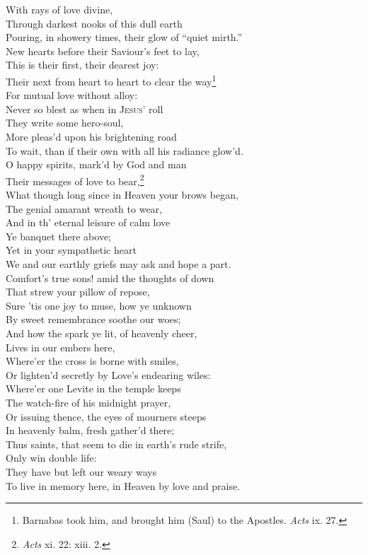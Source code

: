  With rays of love divine, \\
 Through darkest nooks of this dull earth \\
 Pouring, in showery times, their glow of “quiet mirth.” \\
  New hearts before their Saviour’s feet to lay, \\
 This is their first, their dearest joy: \\
 Their next from heart to heart to clear the way\footnote{Barnabas took him, and brought him (Saul) to the Apostles. \emph{Acts} ix. 27.} \\
 For mutual love without alloy: \\
 Never so blest as when in \textsc{Jesus}’ roll \\
 They write some hero-soul, \\
 More pleas’d upon his brightening road \\
 To wait, than if their own with all his radiance glow’d. \\
  O happy spirits, mark’d by God and man \\
 Their messages of love to bear,\footnote{\emph{Acts} xi. 22: xiii. 2.} \\
 What though long since in Heaven your brows began, \\
 The genial amarant wreath to wear, \\
 And in th’ eternal leisure of calm love \\
 Ye banquet there above; \\
 Yet in your sympathetic heart \\
 We and our earthly griefs may ask and hope a part. \\
  Comfort’s true sons! amid the thoughts of down \\
 That strew your pillow of repose, \\
 Sure ’tis one joy to muse, how ye unknown \\
 By sweet remembrance soothe our woes; \\
 And how the spark ye lit, of heavenly cheer, \\
 Lives in our embers here, \\
 Where’er the cross is borne with smiles, \\
 Or lighten’d secretly by Love’s endearing wiles: \\
  Where’er one Levite in the temple keeps \\
 The watch-fire of his midnight prayer, \\
 Or issuing thence, the eyes of mourners steeps \\
 In heavenly balm, fresh gather’d there; \\
 Thus saints, that seem to die in earth’s rude strife, \\
 Only win double life: \\
 They have but left our weary ways \\
 To live in memory here, in Heaven by love and praise.\\

